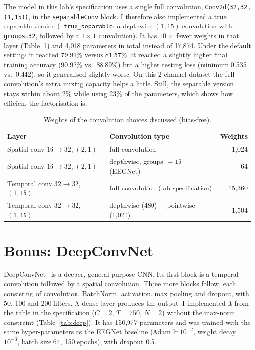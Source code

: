 \documentclass[11pt,a4paper]{article}
\begin{document}
The model in this lab's specification uses a single full convolution, \texttt{Conv2d(32,32,(1,15))}, in the \texttt{separableConv} block. I therefore also implemented a true separable version (\texttt{-true\_separable}: a depthwise $(1,15)$ convolution with \texttt{groups=32}, followed by a $1\times1$ convolution). It has $10\times$ fewer weights in that layer (Table~\ref{tab:params}) and 4{,}018 parameters in total instead of 17{,}874. Under the default settings it reached 79.91\% versus 81.57\%. It reached a slightly higher final training accuracy (90.93\% vs.\ 88.89\%) but a higher testing loss (minimum 0.535 vs.\ 0.442), so it generalised slightly worse. On this 2-channel dataset the full convolution's extra mixing capacity helps a little. Still, the separable version stays within about 2\% while using 23\% of the parameters, which shows how efficient the factorisation is.

\begin{table}[H]
\centering
\caption{Weights of the convolution choices discussed (bias-free).}
\label{tab:params}
\small
\begin{tabular}{llr}
\toprule
Layer & Convolution type & Weights \\
\midrule
Spatial conv $16\to32$, $(2,1)$ & full convolution & 1{,}024 \\
Spatial conv $16\to32$, $(2,1)$ & depthwise, groups $=16$ (EEGNet) & 64 \\
Temporal conv $32\to32$, $(1,15)$ & full convolution (lab specification) & 15{,}360 \\
Temporal conv $32\to32$, $(1,15)$ & depthwise (480) + pointwise (1{,}024) & 1{,}504 \\
\bottomrule
\end{tabular}
\end{table}

\section{Bonus: DeepConvNet}

DeepConvNet~\cite{deepconvnet} is a deeper, general-purpose CNN. Its first block is a temporal convolution followed by a spatial convolution. Three more blocks follow, each consisting of convolution, BatchNorm, activation, max pooling and dropout, with 50, 100 and 200 filters. A dense layer produces the output. I implemented it from the table in the specification ($C=2$, $T=750$, $N=2$) without the max-norm constraint (Table~\ref{tab:deep}). It has 150{,}977 parameters and was trained with the same hyper-parameters as the EEGNet baseline (Adam lr $10^{-2}$, weight decay $10^{-3}$, batch size 64, 150 epochs), with dropout 0.5.
\end{document}
